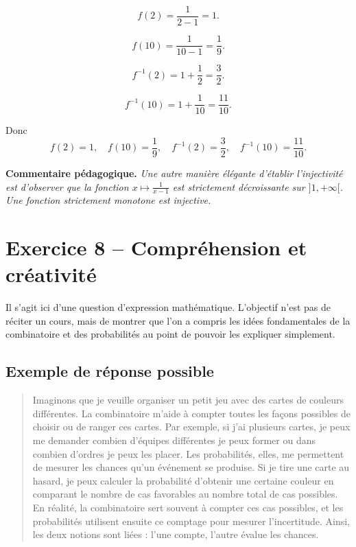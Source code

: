 \documentclass[12pt,a4paper]{article}
\newenvironment{pedago}
{\par\smallskip\noindent\textbf{Commentaire pédagogique. }\itshape}
{\par\smallskip}
\begin{document}
\[
f(2)=\frac{1}{2-1}=1.
\]

\[
f(10)=\frac{1}{10-1}=\frac{1}{9}.
\]

\[
f^{-1}(2)=1+\frac{1}{2}=\frac{3}{2}.
\]

\[
f^{-1}(10)=1+\frac{1}{10}=\frac{11}{10}.
\]

Donc
\[
\boxed{f(2)=1,\quad f(10)=\frac{1}{9},\quad f^{-1}(2)=\frac{3}{2},\quad f^{-1}(10)=\frac{11}{10}.}
\]

\begin{pedago}
Une autre manière élégante d'établir l'injectivité est d'observer que la fonction $x\mapsto \frac{1}{x-1}$ est strictement décroissante sur $]1,+\infty[$. Une fonction strictement monotone est injective.
\end{pedago}

\bigskip

\section*{Exercice 8 -- Compréhension et créativité}

Il s'agit ici d'une question d'expression mathématique. L'objectif n'est pas de réciter un cours, mais de montrer que l'on a compris les idées fondamentales de la combinatoire et des probabilités au point de pouvoir les expliquer simplement.

\subsection*{Exemple de réponse possible}

\begin{quote}
Imaginons que je veuille organiser un petit jeu avec des cartes de couleurs différentes. La combinatoire m'aide à compter toutes les façons possibles de choisir ou de ranger ces cartes. Par exemple, si j'ai plusieurs cartes, je peux me demander combien d'équipes différentes je peux former ou dans combien d'ordres je peux les placer. Les probabilités, elles, me permettent de mesurer les chances qu'un événement se produise. Si je tire une carte au hasard, je peux calculer la probabilité d'obtenir une certaine couleur en comparant le nombre de cas favorables au nombre total de cas possibles. En réalité, la combinatoire sert souvent à compter ces cas possibles, et les probabilités utilisent ensuite ce comptage pour mesurer l'incertitude. Ainsi, les deux notions sont liées : l'une compte, l'autre évalue les chances.
\end{quote}
\end{document}
